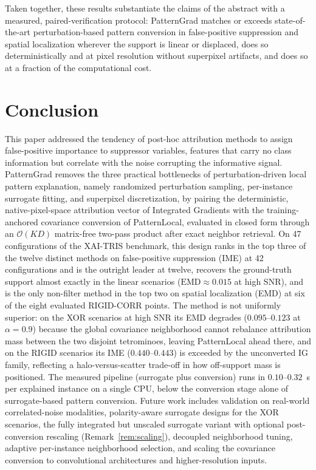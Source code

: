 \documentclass[pdflatex,sn-mathphys-num]{sn-jnl}
\theoremstyle{thmstyleone}
\theoremstyle{thmstyletwo}%
\theoremstyle{thmstylethree}%
\begin{document}
Taken together, these results substantiate the claims of the abstract with a measured, paired-verification protocol: PatternGrad matches or exceeds state-of-the-art perturbation-based pattern conversion in false-positive suppression and spatial localization wherever the support is linear or displaced, does so deterministically and at pixel resolution without superpixel artifacts, and does so at a fraction of the computational cost.

\section{Conclusion}\label{sec:conclusion}

This paper addressed the tendency of post-hoc attribution methods to assign false-positive importance to suppressor variables, features that carry no class information but correlate with the noise corrupting the informative signal. PatternGrad removes the three practical bottlenecks of perturbation-driven local pattern explanation, namely randomized perturbation sampling, per-instance surrogate fitting, and superpixel discretization, by pairing the deterministic, native-pixel-space attribution vector of Integrated Gradients with the training-anchored covariance conversion of PatternLocal, evaluated in closed form through an $\mathcal{O}(KD)$ matrix-free two-pass product after exact neighbor retrieval. On 47 configurations of the XAI-TRIS benchmark, this design ranks in the top three of the twelve distinct methods on false-positive suppression (IME) at 42 configurations and is the outright leader at twelve, recovers the ground-truth support almost exactly in the linear scenarios ($\mathrm{EMD} \approx 0.015$ at high SNR), and is the only non-filter method in the top two on spatial localization (EMD) at six of the eight evaluated RIGID-CORR points. The method is not uniformly superior: on the XOR scenarios at high SNR its EMD degrades ($0.095$--$0.123$ at $\alpha = 0.9$) because the global covariance neighborhood cannot rebalance attribution mass between the two disjoint tetrominoes, leaving PatternLocal ahead there, and on the RIGID scenarios its IME ($0.440$--$0.443$) is exceeded by the unconverted IG family, reflecting a halo-versus-scatter trade-off in how off-support mass is positioned. The measured pipeline (surrogate plus conversion) runs in $0.10$--$0.32$~s per explained instance on a single CPU, below the conversion stage alone of surrogate-based pattern conversion. Future work includes validation on real-world correlated-noise modalities, polarity-aware surrogate designs for the XOR scenarios, the fully integrated but unscaled surrogate variant with optional post-conversion rescaling (Remark~\ref{rem:scaling}), decoupled neighborhood tuning, adaptive per-instance neighborhood selection, and scaling the covariance conversion to convolutional architectures and higher-resolution inputs.
\end{document}
